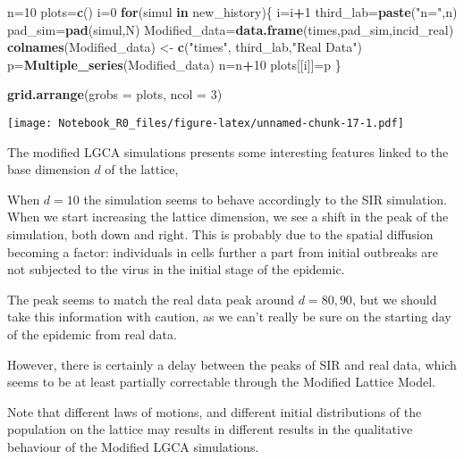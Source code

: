 \documentclass[
]{article}
\newenvironment{Shaded}{\begin{snugshade}}{\end{snugshade}}
\newcommand{\AttributeTok}[1]{\textcolor[rgb]{0.13,0.29,0.53}{#1}}
\newcommand{\ControlFlowTok}[1]{\textcolor[rgb]{0.13,0.29,0.53}{\textbf{#1}}}
\newcommand{\DecValTok}[1]{\textcolor[rgb]{0.00,0.00,0.81}{#1}}
\newcommand{\FunctionTok}[1]{\textcolor[rgb]{0.13,0.29,0.53}{\textbf{#1}}}
\newcommand{\NormalTok}[1]{#1}
\newcommand{\OtherTok}[1]{\textcolor[rgb]{0.56,0.35,0.01}{#1}}
\newcommand{\SpecialCharTok}[1]{\textcolor[rgb]{0.81,0.36,0.00}{\textbf{#1}}}
\newcommand{\StringTok}[1]{\textcolor[rgb]{0.31,0.60,0.02}{#1}}
\begin{document}
\begin{Shaded}
\begin{Highlighting}[]
\NormalTok{n}\OtherTok{=}\DecValTok{10}
\NormalTok{plots}\OtherTok{=}\FunctionTok{c}\NormalTok{()}
\NormalTok{i}\OtherTok{=}\DecValTok{0}
\ControlFlowTok{for}\NormalTok{(simul }\ControlFlowTok{in}\NormalTok{ new\_history)\{}
\NormalTok{  i}\OtherTok{=}\NormalTok{i}\SpecialCharTok{+}\DecValTok{1}
\NormalTok{  third\_lab}\OtherTok{=}\FunctionTok{paste}\NormalTok{(}\StringTok{"n="}\NormalTok{,n)}
\NormalTok{  pad\_sim}\OtherTok{=}\FunctionTok{pad}\NormalTok{(simul,N)}
\NormalTok{  Modified\_data}\OtherTok{=}\FunctionTok{data.frame}\NormalTok{(times,pad\_sim,incid\_real)}
  \FunctionTok{colnames}\NormalTok{(Modified\_data) }\OtherTok{\textless{}{-}} \FunctionTok{c}\NormalTok{(}\StringTok{"times"}\NormalTok{,  third\_lab,}\StringTok{"Real Data"}\NormalTok{)}
\NormalTok{  p}\OtherTok{=}\FunctionTok{Multiple\_series}\NormalTok{(Modified\_data)}
\NormalTok{  n}\OtherTok{=}\NormalTok{n}\SpecialCharTok{+}\DecValTok{10}
\NormalTok{  plots[[i]]}\OtherTok{=}\NormalTok{p}
\NormalTok{\}}

\FunctionTok{grid.arrange}\NormalTok{(}\AttributeTok{grobs =}\NormalTok{ plots, }\AttributeTok{ncol =} \DecValTok{3}\NormalTok{)}
\end{Highlighting}
\end{Shaded}

\texttt{[image: Notebook\_R0\_files/figure-latex/unnamed-chunk-17-1.pdf]}

The modified LGCA simulations presents some interesting features linked
to the base dimension \(d\) of the lattice,

When \(d=10\) the simulation seems to behave accordingly to the SIR
simulation. When we start increasing the lattice dimension, we see a
shift in the peak of the simulation, both down and right. This is
probably due to the spatial diffusion becoming a factor: individuals in
cells further a part from initial outbreaks are not subjected to the
virus in the initial stage of the epidemic.

The peak seems to match the real data peak around \(d=80,90\), but we
should take this information with caution, as we can't really be sure on
the starting day of the epidemic from real data.

However, there is certainly a delay between the peaks of SIR and real
data, which seems to be at least partially correctable through the
Modified Lattice Model.

Note that different laws of motions, and different initial distributions
of the population on the lattice may results in different results in the
qualitative behaviour of the Modified LGCA simulations.
\end{document}
